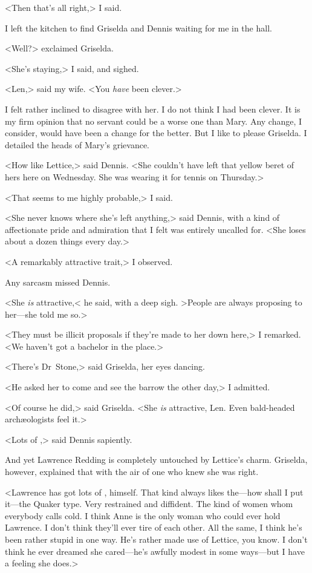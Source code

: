 <Then that's all right,> I said.

I left the kitchen to find Griselda and Dennis waiting for me in the hall.

<Well?> exclaimed Griselda.

<She's staying,> I said, and sighed.

<Len,> said my wife. <You \emph{have} been clever.>

I felt rather inclined to disagree with her. I do not think I had been clever. It is my firm opinion that no servant could be a worse one than Mary. Any change, I consider, would have been a change for the better. But I like to please Griselda. I detailed the heads of Mary's grievance.

<How like Lettice,> said Dennis. <She couldn't have left that yellow beret of hers here on Wednesday. She was wearing it for tennis on Thursday.>

<That seems to me highly probable,> I said.

<She never knows where she's left anything,> said Dennis, with a kind of affectionate pride and admiration that I felt was entirely uncalled for. <She loses about a dozen things every day.>

<A remarkably attractive trait,> I observed.

Any sarcasm missed Dennis.

<She \emph{is} attractive,< he said, with a deep sigh. >People are always proposing to her—she told me so.>

<They must be illicit proposals if they're made to her down here,> I remarked. <We haven't got a bachelor in the place.>

<There's Dr~Stone,> said Griselda, her eyes dancing.

<He asked her to come and see the barrow the other day,> I admitted.

<Of course he did,> said Griselda. <She \emph{is} attractive, Len. Even bald-headed archæologists feel it.>

<Lots of ,> said Dennis sapiently.

And yet Lawrence Redding is completely untouched by Lettice's charm. Griselda, however, explained that with the air of one who knew she was right.

<Lawrence has got lots of , himself. That kind always likes the—how shall I put it—the Quaker type. Very restrained and diffident. The kind of women whom everybody calls cold. I think Anne is the only woman who could ever hold Lawrence. I don't think they'll ever tire of each other. All the same, I think he's been rather stupid in one way. He's rather made use of Lettice, you know. I don't think he ever dreamed she cared—he's awfully modest in some ways—but I have a feeling she does.>


